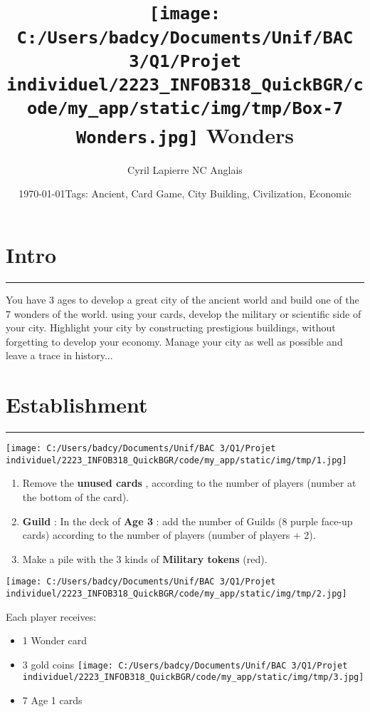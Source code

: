 \documentclass{scrartcl}%
\title{\texttt{[image: C:/Users/badcy/Documents/Unif/BAC 3/Q1/Projet individuel/2223\_INFOB318\_QuickBGR/code/my\_app/static/img/tmp/Box-7 Wonders.jpg]}\break 7 Wonders }%
\author{Cyril Lapierre NC Anglais}%
\date{\today \break Tags: Ancient, Card Game, City Building, Civilization, Economic}%
\begin{document}
%
\normalsize%
\maketitle\thispagestyle{header}%
\pagestyle{header}%
\section{ Intro
}%
\label{sec:Intro}%
\rule{18cm}{0.07cm}\break%
You have 3 ages to develop a great city of the ancient world and build one of the 7 wonders of the
%
world. using your cards, develop the military or scientific side of your city. Highlight
%
your city by constructing prestigious buildings, without forgetting to develop your economy.
%
Manage your city as well as possible and leave a trace in history...


%
\section{ Establishment
}%
\label{sec:Establishment}%
\rule{18cm}{0.07cm}\break%
%
\begin{center}\texttt{[image: C:/Users/badcy/Documents/Unif/BAC 3/Q1/Projet individuel/2223\_INFOB318\_QuickBGR/code/my\_app/static/img/tmp/1.jpg]}\end{center}%

%
\begin{enumerate}%
\item%
%
 Remove the %
\textbf{unused cards}%
, according to the number of players (number at the bottom of the card).
%
\item%
%
\textbf{Guild}%
: In the deck of %
\textbf{Age 3}%
: add the number of Guilds (8 purple face{-}up cards) according to the number of players (number of players + 2).
%
\item%
%
 Make a pile with the 3 kinds of %
\textbf{Military tokens}%
\textit{ }%
 (red).
%
\end{enumerate}%
%
\begin{center}\texttt{[image: C:/Users/badcy/Documents/Unif/BAC 3/Q1/Projet individuel/2223\_INFOB318\_QuickBGR/code/my\_app/static/img/tmp/2.jpg]}\end{center}%

%
Each player receives:
%
\begin{itemize}%
\item%
%
 1 Wonder card
%
\item%
%
 3 gold coins%
\texttt{[image: C:/Users/badcy/Documents/Unif/BAC 3/Q1/Projet individuel/2223\_INFOB318\_QuickBGR/code/my\_app/static/img/tmp/3.jpg]}%

%
\item%
%
 7 Age 1 cards
%
\end{itemize}
\end{document}
